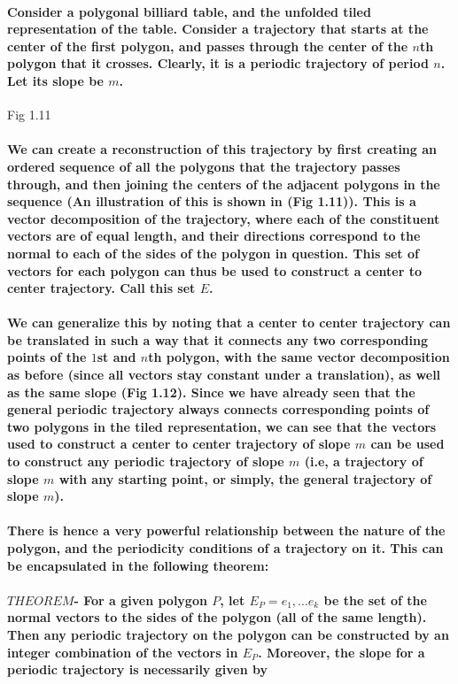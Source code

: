 \documentclass{article}
\begin{document}
\paragraph{Consider a polygonal billiard table, and the unfolded tiled representation of the table. Consider a trajectory that starts at the center of the first polygon, and passes through the center of the $n$th polygon that it crosses. Clearly, it is a periodic trajectory of period $n$. Let its slope be $m$.}

Fig 1.11

\paragraph{We can create a reconstruction of this trajectory by first creating an ordered sequence of all the polygons that the trajectory passes through, and then joining the centers of the adjacent polygons in the sequence (An illustration of this is shown in (Fig 1.11)). This is a vector decomposition of the trajectory, where each of the constituent vectors are of equal length, and their directions correspond to the normal to each of the sides of the polygon in question. This set of vectors for each polygon can thus be used to construct a center to center trajectory. Call this set $E$.}

\paragraph{We can generalize this by noting that a center to center trajectory can be translated in such a way that it connects any two corresponding points of the $1$st and $n$th polygon, with the same vector decomposition as before (since all vectors stay constant under a translation), as well as the same slope (Fig 1.12). Since we have already seen that the general periodic trajectory always connects corresponding points of two polygons in the tiled representation, we can see that the vectors used to construct a center to center trajectory of slope $m$ can be used to construct any periodic trajectory of slope $m$ (i.e, a trajectory of slope $m$ with any starting point, or simply, the general trajectory of slope $m$).}


\paragraph{There is hence a very powerful relationship between the nature of the polygon, and the periodicity conditions of a trajectory on it. This can be encapsulated in the following theorem:}

\paragraph{$THEOREM$- For a given polygon $P$, let $E_P = {e_1,...e_k}$ be the set of the normal vectors to the sides of the polygon (all of the same length). Then any periodic trajectory on the polygon can be constructed by an integer combination of the vectors in $E_P$. Moreover, the slope for a periodic trajectory is necessarily given by}
\end{document}
